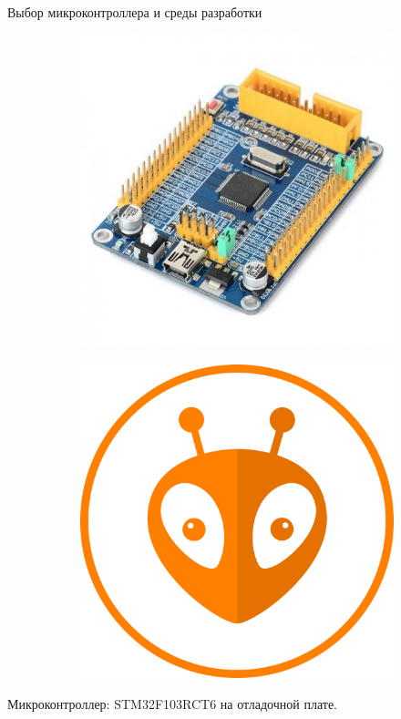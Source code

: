 \documentclass[10pt]{beamer}
\begin{document}
\begin{frame}{Выбор микроконтроллера и среды разработки}
\begin{figure}
     \begin{subfigure}[H]{0.45\textwidth}
         \centering
         \includegraphics[width=\textwidth]{stmka}
     \end{subfigure}
     \hfill
     \begin{subfigure}[H]{0.35\textwidth}
         \centering
         \includegraphics[width=\textwidth]{PlatformIO}
     \end{subfigure}
\end{figure}
  Микроконтроллер: STM32F103RCT6 на отладочной плате.
  

\end{frame}
\end{document}
